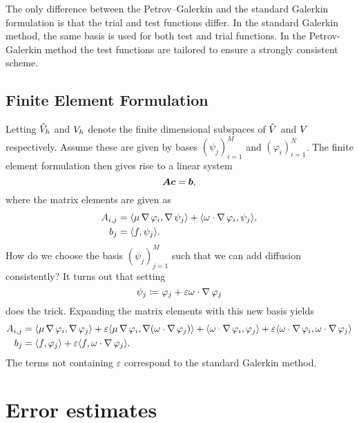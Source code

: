 The only difference between the Petrov--Galerkin and the standard Galerkin
formulation is that the trial and test functions differ. In the standard
Galerkin method, the same basis is used for both test and trial functions.  In
the Petrov-Galerkin method the test functions are tailored to ensure a
strongly consistent scheme.

\subsection{Finite Element Formulation}
\label{sub:finite_element_formulation_diffusion}

Letting \( \hat{V}_h\) and \(V_h\) denote the finite dimensional subspaces
of \( \hat{V} \) and \( V \) respectively. Assume these are given by bases
\( (\psi_j)_{i=1}^M \) and \( (\varphi_i)_{i=1}^N \).  The finite element
formulation then gives rise to a linear system
\begin{equation}
    \boldsymbol{A} \boldsymbol{c} = \boldsymbol{b},
\end{equation}
where the matrix elements are given as
\begin{align}
    A_{i, j} &= \langle \mu \operatorname{\mathop{}\!\nabla} \varphi_i , \operatorname{\mathop{}\!\nabla} \psi_j \rangle + \langle \omega \cdot \operatorname{\mathop{}\!\nabla} \varphi_i, \psi_j \rangle, \\
    b_j &= \langle f, \psi_j \rangle.
\end{align}
How do we choose the basis \( (\psi_j)_{j=1}^M \) such that we can add
diffusion consistently? It turns out that setting
\begin{equation}
    \psi_j \coloneqq \varphi_j + \varepsilon\omega \cdot \operatorname{\mathop{}\!\nabla} \varphi_j
\end{equation}
does the trick. Expanding the matrix elements with this new basis yields
\begin{align}
    A_{i, j} &= \langle \mu \grad \varphi_i , \grad\varphi_j \rangle
    + \varepsilon\langle \mu \grad \varphi_i, \grad (\omega\cdot\grad\varphi_j)\rangle
    + \langle \omega \cdot \grad \varphi_i, \varphi_j \rangle
    + \varepsilon\langle \omega \cdot \grad \varphi_i,  \omega \cdot \grad \varphi_j\rangle\\
    b_j &= \langle f, \varphi_j \rangle + \varepsilon\langle f,  \omega \cdot \grad \varphi_j \rangle.
\end{align}
The terms not containing \( \varepsilon \) correspond to the standard Galerkin
method. 

\section{Error estimates}
\label{sub:chp_2_error_estimates}

